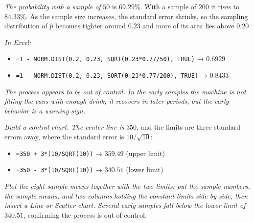 \documentclass[
  11pt,
  letterpaper,
  DIV=11,
  numbers=noendperiod,
  oneside,
  open=any]{scrreprt}
\providecommand{\tightlist}{%
  \setlength{\itemsep}{0pt}\setlength{\parskip}{0pt}}\usepackage{longtable,booktabs,array}
\newenvironment{bsanswerkey}[2]{%
  \begin{tcolorbox}[bsbase, colback=bspaper2, colframe=bsline, fontupper=\small,
    title={\hypertarget{a-#1}{}\label{a-#1}\hyperlink{q-#1}{\textcolor{bsink2}{\MakeUppercase{#2}}}\hfill
      \hyperlink{q-#1}{\textcolor{bsaccent}{\normalfont\footnotesize back to page \pageref{q-#1}}}}]}%
  {\end{tcolorbox}}
\begin{document}
\begin{bsanswerkey}{bsans110}{Exercise 3, question 2}

\emph{The probability with a sample of} \(50\) is \(69.29\%\). With a
sample of \(200\) it rises to \(84.33\%\). As the sample size increases,
the standard error shrinks, so the sampling distribution of \(\hat{p}\)
becomes tighter around \(0.23\) and more of its area lies above
\(0.20\).

\emph{In Excel:}

\begin{itemize}
\tightlist
\item
  \texttt{=1\ -\ NORM.DIST(0.2,\ 0.23,\ SQRT(0.23*0.77/50),\ TRUE)} →
  \(0.6929\)
\item
  \texttt{=1\ -\ NORM.DIST(0.2,\ 0.23,\ SQRT(0.23*0.77/200),\ TRUE)} →
  \(0.8433\)
\end{itemize}

\end{bsanswerkey}

\begin{bsanswerkey}{bsans111}{Exercise 4, question 1}

\emph{The process appears to be out of control. In the early samples the
machine is not filling the cans with enough drink; it recovers in later
periods, but the early behavior is a warning sign.}

\emph{Build a control chart. The center line is} \(350\), and the limits
are three standard errors away, where the standard error is
\(10/\sqrt{10}\):

\begin{itemize}
\tightlist
\item
  \texttt{=350\ +\ 3*(10/SQRT(10))} → \(359.49\) (upper limit)
\item
  \texttt{=350\ -\ 3*(10/SQRT(10))} → \(340.51\) (lower limit)
\end{itemize}

\emph{Plot the eight sample means together with the two limits: put the
sample numbers, the sample means, and two columns holding the constant
limits side by side, then insert a Line or Scatter chart. Several early
samples fall below the lower limit of} \(340.51\), confirming the
process is out of control.

\end{bsanswerkey}
\end{document}
